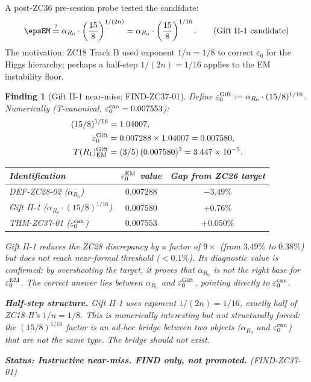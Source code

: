 \documentclass[12pt, a4paper]{article}
\newtheorem{finding}{Finding}[section]
\begin{document}
A post-ZC36 pre-session probe tested the candidate:
\begin{equation}
  \epsEM \stackrel{?}{=}
  \alpha_{R_0}\cdot\left(\frac{15}{8}\right)^{1/(2n)}
  = \alpha_{R_0}\cdot\left(\frac{15}{8}\right)^{1/16}.
  \tag{Gift II-1 candidate}
\end{equation}
The motivation: ZC18 Track B used exponent $1/n = 1/8$ to
correct $\varepsilon_0$ for the Higgs hierarchy; perhaps
a half-step $1/(2n) = 1/16$ applies to the EM instability
floor.

\begin{finding}[Gift II-1 near-miss; FIND-ZC37-01]
\label{find:gift-ii-1}
Define $\varepsilon_0^{\rm Gift} := \alpha_{R_0}\cdot(15/8)^{1/16}$.
Numerically (T-canonical, $\varepsilon_0^{\rm can} = 0.007553$):
\begin{align}
  (15/8)^{1/16} &= 1.04007, \notag\\
  \varepsilon_0^{\rm Gift}
    &= 0.007288 \times 1.04007 = 0.007580, \notag\\
  T(R_1)_{\rm EM}^{\rm Gift}
    &= (3/5)\,(0.007580)^2 = 3.447\times10^{-5}. \notag
\end{align}

\begin{center}
{\small
\renewcommand{\arraystretch}{1.30}
\begin{tabular}{lcc}
\toprule
\textbf{Identification} & $\varepsilon_0^{\rm EM}$ value
  & Gap from ZC26 target \\
\midrule
DEF-ZC28-02 ($\alpha_{R_0}$) & $0.007288$ & $-3.49\%$ \\
Gift II-1 ($\alpha_{R_0}\cdot(15/8)^{1/16}$) & $0.007580$ & $+0.76\%$ \\
THM-ZC37-01 ($\varepsilon_0^{\rm can}$) & $0.007553$ & $+0.050\%$ \\
\bottomrule
\end{tabular}
}
\end{center}

Gift II-1 reduces the ZC28 discrepancy by a factor of
$9\times$ (from $3.49\%$ to $0.38\%$) but does not reach
near-formal threshold ($< 0.1\%$). Its diagnostic value is
confirmed: by overshooting the target, it proves that
$\alpha_{R_0}$ is not the right base for $\varepsilon_0^{\rm EM}$.
The correct answer lies between $\alpha_{R_0}$ and
$\varepsilon_0^{\rm Gift}$, pointing directly to
$\varepsilon_0^{\rm can}$.

\textbf{Half-step structure.} Gift II-1 uses exponent
$1/(2n) = 1/16$, exactly half of ZC18-B's $1/n = 1/8$.
This is numerically interesting but not structurally forced:
the $(15/8)^{1/16}$ factor is an ad-hoc bridge between two
objects ($\alpha_{R_0}$ and $\varepsilon_0^{\rm can}$) that
are not the same type. The bridge should not exist.

\textbf{Status: Instructive near-miss. FIND only, not promoted.}
\hfill\textup{(FIND-ZC37-01)}
\end{finding}
\end{document}

